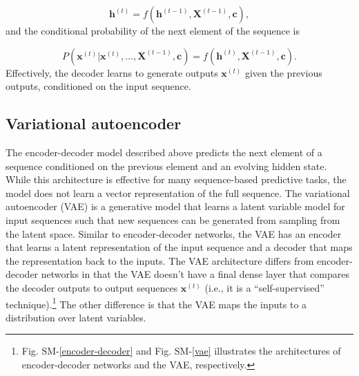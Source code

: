 \documentclass[hidelinks,12pt]{article}
\begin{document}
\begin{equation}
\boldsymbol{h}^{(t)} = f \left( \boldsymbol{h}^{(t-1)}, \boldsymbol{X}^{(t-1)}, \boldsymbol{c} \right), \label{eq:decoder}
\end{equation} and the conditional probability of the next element of the sequence is 

\begin{equation}
P (\boldsymbol{x}^{(t)} | \boldsymbol{x}^{(t)}, \ldots, \boldsymbol{X}^{(t-1)}, \boldsymbol{c}) =  f \left( \boldsymbol{h}^{(t)}, \boldsymbol{X}^{(t-1)}, \boldsymbol{c} \right).
\end{equation}  Effectively, the decoder learns to generate outputs $\boldsymbol{x}^{(t)}$ given the previous outputs, conditioned on the input sequence. 

\subsection{Variational autoencoder}

The encoder-decoder model described above predicts the next element of a sequence conditioned on the previous element and an evolving hidden state. While this architecture is effective for many sequence-based predictive tasks, the model does not learn a vector representation of the full sequence. The variational autoencoder (VAE) \citep{kingma2013auto} is a generative model that learns a latent variable model for input sequences such that new sequences can be generated from sampling from the latent space. Similar to encoder-decoder networks, the VAE has an encoder that learns a latent representation of the input sequence and a decoder that maps the representation back to the inputs. The VAE architecture differs from encoder-decoder networks in that the VAE doesn't have a final dense layer that compares the decoder outputs to output sequences $\boldsymbol{x}^{(t)}$ (i.e., it is a ``self-supervised'' technique).\footnote{Fig. SM-\ref{encoder-decoder} and Fig. SM-\ref{vae} illustrates the architectures of encoder-decoder networks and the VAE, respectively.} The other difference is that the VAE maps the inputs to a distribution over latent variables. 
\end{document}
